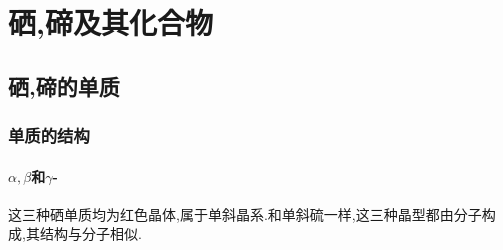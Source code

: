 \documentclass{ctexart}
\begin{document}
\section{硒,碲及其化合物}
\subsection{硒,碲的单质}
\subsubsection{单质的结构}
\paragraph{$\alpha,\beta$和$\gamma$-}
这三种硒单质均为红色晶体,属于单斜晶系.和单斜硫一样,这三种晶型都由分子构成,其结构与分子相似.
\end{document}
